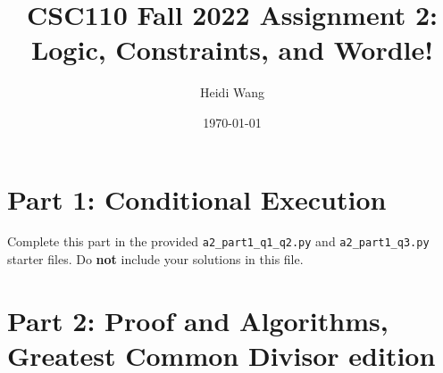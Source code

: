 \documentclass[11pt]{article}
\title{CSC110 Fall 2022 Assignment 2: Logic, Constraints, and Wordle!}
\author{Heidi Wang}
\date{\today}
\begin{document}
\maketitle

\section*{Part 1: Conditional Execution}

Complete this part in the provided \texttt{a2\_part1\_q1\_q2.py} and \texttt{a2\_part1\_q3.py} starter files.
Do \textbf{not} include your solutions in this file.

\section*{Part 2: Proof and Algorithms, Greatest Common Divisor edition}
\end{document}
